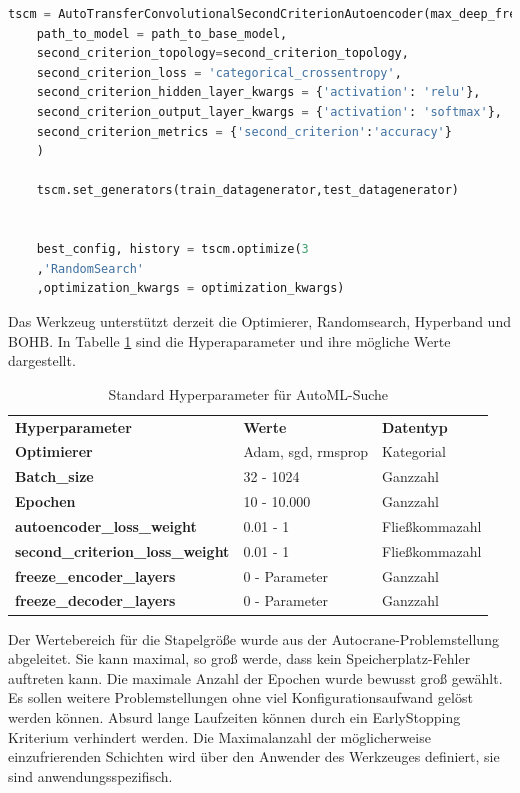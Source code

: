 	\begin{lstlisting}[language=python,caption=Beispiel AutoTransferSecondCriterionAutoenocder in Python, label=lst:BspAutoTransferSecondCriterionAutoenocder]
	tscm = AutoTransferConvolutionalSecondCriterionAutoencoder(max_deep_freeze=2,
	path_to_model = path_to_base_model,            
	second_criterion_topology=second_criterion_topology,
	second_criterion_loss = 'categorical_crossentropy',                                                                                                   
	second_criterion_hidden_layer_kwargs = {'activation': 'relu'},
	second_criterion_output_layer_kwargs = {'activation': 'softmax'},
	second_criterion_metrics = {'second_criterion':'accuracy'}
	)
	
	tscm.set_generators(train_datagenerator,test_datagenerator)
	
	
	best_config, history = tscm.optimize(3
	,'RandomSearch'
	,optimization_kwargs = optimization_kwargs)
	\end{lstlisting}
	Das Werkzeug unterstützt derzeit die Optimierer, Randomsearch, Hyperband und BOHB.	In Tabelle \ref{table:HyperparparameterAutoML} sind die Hyperaparameter und ihre mögliche Werte dargestellt.
	\begin{table}[ht]
		\centering
		\begin{tabularx}{\textwidth}{lll}
			 \textbf{Hyperparameter} & \textbf{Werte}  & \textbf{Datentyp} 					 	\\
			\textbf{Optimierer}   & 	Adam, sgd, rmsprop		&	Kategorial			\\
			\textbf{Batch\_size}  &  32 - 1024					 &	Ganzzahl			        \\
			\textbf{Epochen}	 &  10 - 10.000				 &	Ganzzahl					 	\\
			\textbf{autoencoder\_loss\_weight}	 	  &  0.01 - 1	 &	Fließkommazahl	\\
			\textbf{second\_criterion\_loss\_weight}	& 0.01 - 1  &	Fließkommazahl	 \\
			\textbf{freeze\_encoder\_layers}	 	  &  0 - Parameter  &	Ganzzahl						\\
			\textbf{freeze\_decoder\_layers}	 	  &  0 - Parameter &	Ganzzahl								
		\end{tabularx}
		\caption{Standard Hyperparameter für AutoML-Suche}
		\label{table:HyperparparameterAutoML}
	\end{table}
	Der Wertebereich für die Stapelgröße wurde aus der Autocrane-Problemstellung abgeleitet. Sie kann maximal, so groß werde, dass kein Speicherplatz-Fehler auftreten kann. Die maximale Anzahl der Epochen wurde bewusst groß gewählt. Es sollen weitere  Problemstellungen ohne viel Konfigurationsaufwand gelöst werden können. Absurd lange Laufzeiten können durch ein EarlyStopping Kriterium verhindert werden. Die Maximalanzahl der möglicherweise einzufrierenden Schichten wird über den Anwender des Werkzeuges definiert, sie sind anwendungsspezifisch.
	
	

	
	